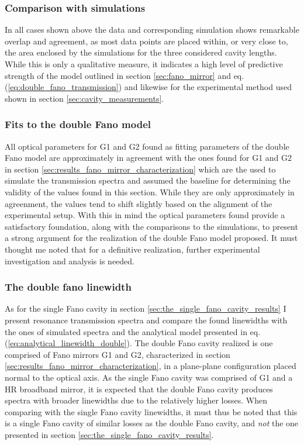 \subsubsection*{Comparison with simulations}

In all cases shown above the data and corresponding simulation shows remarkable overlap and agreement, as most data points are placed within, or very close to, the area enclosed by the simulations for the three considered cavity lengths. While this is only a qualitative measure, it indicates a high level of predictive strength of the model outlined in section \ref{sec:fano_mirror} and eq. (\ref{eq:double_fano_transmission}) and likewise for the experimental method used shown in section \ref{sec:cavity_measurements}.

\subsubsection*{Fits to the double Fano model}
 
All optical parameters for G1 and G2 found as fitting parameters of the double Fano model are approximately in agreement with the ones found for G1 and G2 in section \ref{sec:results_fano_mirror_characterization} which are the used to simulate the transmission spectra and assumed the baseline for determining the validity of the values found in this section. While they are only approximately in agreenment, the values tend to shift slightly based on the alignment of the experimental setup. With this in mind the optical parameters found provide a satisfactory foundation, along with the comparisons to the simulations, to present a strong argument for the realization of the double Fano model proposed. It must thought me noted that for a definitive realization, further experimental investigation and analysis is needed. 

\subsubsection{The double fano linewidth}

As for the single Fano cavity in section \ref{sec:the_single_fano_cavity_results} I present resonance transmission spectra and compare the found linewidths with the ones of simulated spectra and the analytical model presented in eq. (\ref{eq:analytical_linewidth_double}). The double Fano cavity realized is one comprised of Fano mirrors G1 and G2, characterized in section \ref{sec:results_fano_mirror_characterization}, in a plane-plane configuration placed normal to the optical axis. As the single Fano cavity was comprised of G1 and a HR broadband mirror, it is expected that the double Fano cavity produces spectra with broader linewidths due to the relatively higher losses. When comparing with the single Fano cavity linewidths, it must thus be noted that this is a single Fano cavity of similar losses as the double Fano cavity, and \emph{not} the one presented in section \ref{sec:the_single_fano_cavity_results}.

